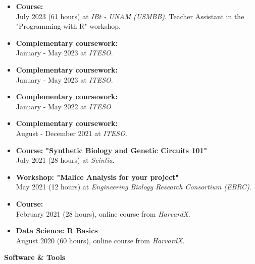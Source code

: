\documentclass{simplecv}
\begin{document}
\begin{multicols}{2}
\vspace{-8pt}
{\small
  \begin{itemize}[leftmargin=*]
  \setlength{\itemsep}{6pt}
    \item \textbf{Course: }\\July 2023 (61 hours) at \textit{IBt - UNAM (USMBB)}. Teacher Assistant in the "Programming with R" workshop.
    \item \textbf{Complementary coursework: }\\January - May 2023 at \textit{ITESO}.
    \item \textbf{Complementary coursework: }\\January - May 2023 at \textit{ITESO}.
    \item \textbf{Complementary coursework:  }\\January - May 2022 at \textit{ITESO}
    \item \textbf{Complementary coursework: }\\August - December 2021 at \textit{ITESO}.
    \item \textbf{Course: "Synthetic Biology and Genetic Circuits 101"}\\July 2021 (28 hours) at \textit{Scintia}.
    \item \textbf{Workshop: "Malice Analysis for your project"}\\May 2021 (12 hours) at \textit{Engineering Biology Research Consortium (EBRC)}.
    \item \textbf{Course: }\\February 2021 (28 hours), online course from \textit{HarvardX}.
    \item \textbf{Data Science: R Basics}\\August 2020 (60 hours), online course from \textit{HarvardX}.
  \end{itemize}
}

\bigskip

\vspace{-6pt}
\textbf{Software \& Tools}\\


\end{multicols}
\end{document}
